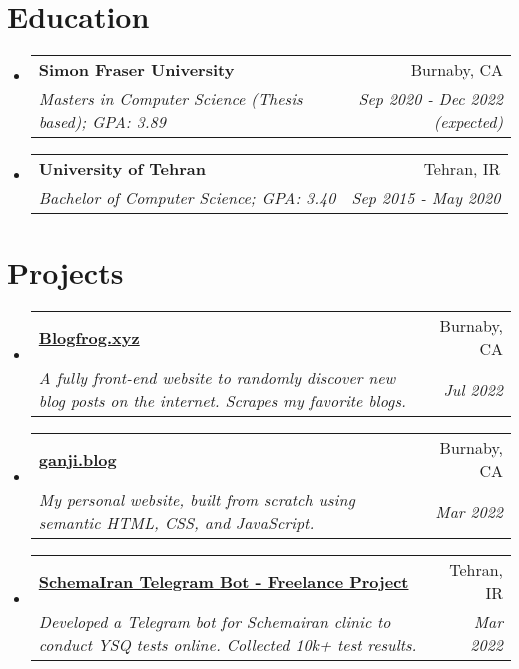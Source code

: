 \documentclass[letterpaper,10.8pt]{article}
\makeatletter
\newcommand{\resumeSubheading}[4]{
  \vspace{-1pt}\item
    \begin{tabular*}{0.97\textwidth}{l@{\extracolsep{\fill}}r}
      \textbf{#1} & #2 \\
      \textit{\small#3} & \textit{\small #4} \\
    \end{tabular*}\vspace{-4pt}
}
\newcommand{\resumeSubHeadingListStart}{\begin{itemize}[leftmargin=*]}
\newcommand{\resumeSubHeadingListEnd}{\end{itemize}}
\makeatother
\begin{document}
\section{Education}
  \resumeSubHeadingListStart
    \resumeSubheading
      {Simon Fraser University}{Burnaby, CA}
      {Masters in Computer Science (Thesis based);  GPA: 3.89}{Sep 2020 - Dec 2022 (expected)}
      
	    
    \resumeSubheading
      {University of Tehran}{Tehran, IR}
      {Bachelor of Computer Science;  GPA: 3.40}{Sep 2015 - May 2020}
  \resumeSubHeadingListEnd

\section{Projects}

\resumeSubHeadingListStart
    \resumeSubheading
      {\href{http://blogfrog.xyz}{Blogfrog.xyz}}{Burnaby, CA}
      {A fully front-end website to randomly discover new blog posts on the internet. Scrapes my favorite blogs.}{Jul 2022}
	    
    \resumeSubheading
      {\href{http://ganji.blog/me}{ganji.blog}}{Burnaby, CA}
      {My personal website, built from scratch using semantic HTML, CSS, and JavaScript.}{Mar 2022}
      
    \resumeSubheading
      {\href{https://t.me/SchemaIran_Bot}{SchemaIran Telegram Bot - Freelance Project}}{Tehran, IR}
      {Developed a Telegram bot for Schemairan clinic to conduct YSQ tests online. Collected 10k+ test results.}{Mar 2022}
\resumeSubHeadingListEnd
\end{document}

